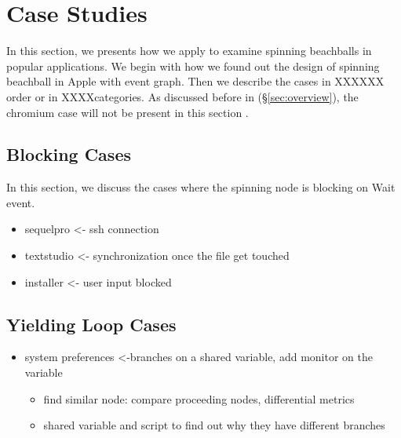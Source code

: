 \section{Case Studies}\label{sec:casestudy}

In this section, we presents how we apply \xxx to examine spinning
beachballs in \nbug popular applications. We begin with how we found out the
design of spinning beachball in Apple with event graph. Then we describe
the cases in XXXXXX order or in XXXXcategories. As discussed before in
(\S\ref{sec:overview}), the chromium case will not be present in this section .



\subsection{Blocking Cases}
In this section, we discuss the cases where the spinning node is blocking on Wait event.
\begin{itemize}
\item sequelpro <- ssh connection
\item textstudio <- synchronization once the file get touched
\item installer <- user input blocked
\end{itemize}


\subsection{Yielding Loop Cases}
\begin{itemize}
\item system preferences <-branches on a shared variable, add monitor on the variable
	\begin{itemize}
		\item find similar node: compare proceeding nodes, differential metrics
		\item shared variable and script to find out why they have different branches
	\end{itemize}
\end{itemize}


